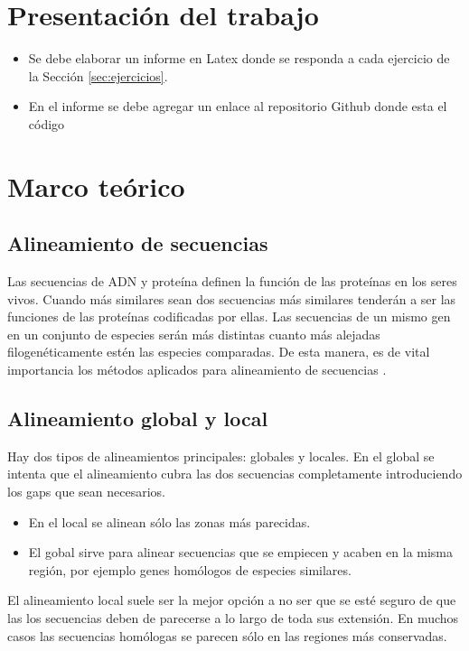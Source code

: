 \documentclass{article}
\begin{document}
\section{Presentación del trabajo}
\begin{itemize}
    \item Se debe elaborar un informe en Latex donde se responda a cada ejercicio de la Sección \ref{sec:ejercicios}.
    \item En el informe se debe agregar un enlace al repositorio Github donde esta el código 
\end{itemize}

\clearpage

\section{Marco teórico}

\subsection{Alineamiento de secuencias}
Las secuencias de ADN y proteína definen la función de las proteínas en los seres vivos. Cuando más similares sean dos secuencias más similares tenderán a ser las funciones de las proteínas codificadas por ellas. Las secuencias de un mismo gen en un conjunto de especies serán más distintas cuanto más alejadas filogenéticamente estén las especies comparadas. De esta manera, es de vital importancia los métodos aplicados para alineamiento de secuencias \cite{comav2020}. 

\subsection{Alineamiento global y local}
Hay dos tipos de alineamientos principales: globales y locales. En el global se intenta que el alineamiento cubra las dos secuencias completamente introduciendo los gaps que sean necesarios. 
\begin{itemize}
    \item  En el local se alinean sólo las zonas más parecidas.
    \item  El gobal sirve para alinear secuencias que se empiecen y acaben en la misma región, por ejemplo genes homólogos de especies similares.
\end{itemize}

El alineamiento local suele ser la mejor opción a no ser que se esté seguro de que las los secuencias deben de parecerse a lo largo de toda sus extensión. En muchos casos las secuencias homólogas se parecen sólo en las regiones más conservadas.
\end{document}
